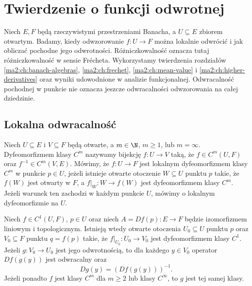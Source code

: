 \chapter{Twierdzenie o funkcji odwrotnej}
\label{ma2:ch:inverse-function}

Niech $E,F$ będą rzeczywistymi przestrzeniami Banacha, a
$U\subseteq E$ zbiorem otwartym. Badamy, kiedy odwzorowanie
$f:U\to F$ można lokalnie odwrócić i jak obliczać pochodne
jego odwrotności. Różniczkowalność oznacza tutaj
różniczkowalność w sensie Frécheta. Wykorzystamy twierdzenia rozdziałów
\ref{ma2:ch:banach-algebras}, \ref{ma2:ch:frechet},
\ref{ma2:ch:mean-value} i \ref{ma2:ch:higher-derivatives}
oraz wyniki udowodnione w analizie funkcjonalnej.
Odwracalność pochodnej w punkcie nie oznacza jeszcze
odwracalności odwzorowania na całej dziedzinie.

\section{Lokalna odwracalność}

\begin{definicja}
\label{ma2:def:local-diffeomorphism}
Niech $U\subseteq E$ i $V\subseteq F$ będą otwarte,
a $m\in\N$, $m\ge1$, lub $m=\infty$.
Dyfeomorfizmem klasy $C^m$ nazywamy bijekcję
$f:U\to V$ taką, że $f\in C^m(U,F)$ oraz
$f^{-1}\in C^m(V,E)$.
Mówimy, że $f:U\to F$ jest lokalnym dyfeomorfizmem
klasy $C^m$ w punkcie $p\in U$, jeżeli istnieje otwarte
otoczenie $W\subseteq U$ punktu $p$ takie, że
$f(W)$ jest otwarty w $F$, a $f|_W:W\to f(W)$
jest dyfeomorfizmem klasy $C^m$.
Jeżeli warunek ten zachodzi w każdym punkcie $U$,
mówimy o lokalnym dyfeomorfizmie na $U$.
\end{definicja}

\begin{twierdzenie}
\label{ma2:thm:inverse-function}
Niech $f\in C^1(U,F)$, $p\in U$ oraz niech
$A=Df(p):E\to F$ będzie izomorfizmem liniowym
i topologicznym. Istnieją wtedy otwarte otoczenia
$U_0\subseteq U$ punktu $p$ oraz $V_0\subseteq F$
punktu $q=f(p)$ takie, że
$f|_{U_0}:U_0\to V_0$ jest dyfeomorfizmem klasy $C^1$.
Jeżeli $g:V_0\to U_0$ jest jego odwrotnością,
to dla każdego $y\in V_0$ operator $Df(g(y))$
jest odwracalny oraz
\[
 Dg(y)=(Df(g(y)))^{-1}.
\]
Jeżeli ponadto $f$ jest klasy $C^m$ dla $m\ge2$
lub klasy $C^\infty$, to $g$ jest tej samej klasy.
\end{twierdzenie}

